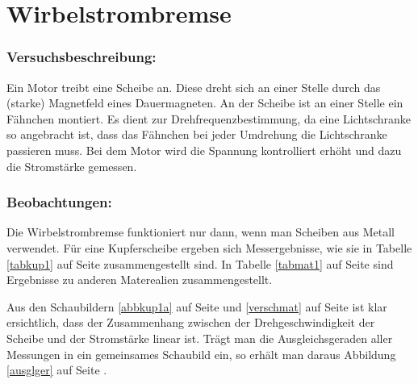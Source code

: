 		\section{Wirbelstrombremse}
		\label{wistrobre}
		
		\subsubsection*{Versuchsbeschreibung:}
Ein Motor treibt eine Scheibe an. Diese dreht sich an einer Stelle durch das (starke) Magnetfeld eines Dauermagneten. An der Scheibe ist an einer Stelle ein Fähnchen montiert. Es dient zur Drehfrequenzbestimmung, da eine Lichtschranke so angebracht ist, dass das Fähnchen bei jeder Umdrehung die Lichtschranke passieren muss. Bei dem Motor wird die Spannung kontrolliert erhöht und dazu die Stromstärke gemessen.
		
		\subsubsection*{Beobachtungen:}		
Die Wirbelstrombremse funktioniert nur dann, wenn man Scheiben aus Metall verwendet. Für eine Kupferscheibe ergeben sich Messergebnisse, wie sie in Tabelle \ref{tabkup1} auf Seite \pageref{tabkup1} zusammengestellt sind. In Tabelle \ref{tabmat1} auf Seite \pageref{tabmat1} sind Ergebnisse zu anderen Materealien zusammengestellt.

Aus den Schaubildern \ref{abbkup1a} auf Seite \pageref{abbkup1a} und \ref{verschmat} auf Seite \pageref{verschmat} ist klar ersichtlich, dass der Zusammenhang zwischen der Drehgeschwindigkeit der Scheibe und der Stromstärke linear ist. Trägt man die Ausgleichsgeraden aller Messungen in ein gemeinsames Schaubild ein, so erhält man daraus Abbildung \ref{ausglger} auf Seite \pageref{ausglger}.

